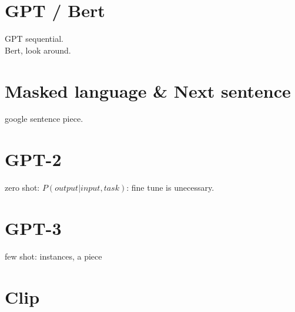 \documentclass[]{article}
\begin{document}
    \section[]{GPT / Bert}
        GPT sequential. \\
        Bert, look around.
    \section{Masked language \& Next sentence}
        google sentence piece.
    \section{GPT-2}
        zero shot: $P(output | input, task)$: fine tune is unecessary.
    \section[]{GPT-3}
        few shot: instances, a piece 
    \section[]{Clip}
        



    
\end{document}
